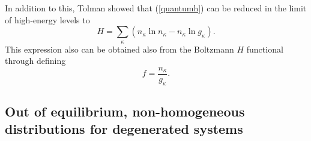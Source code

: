\documentclass{article}
\begin{document}
In addition to this, Tolman showed that (\ref{quantumh}) can be reduced in the limit of high-energy levels to
\begin{equation}
    H = \sum_{\kappa} (n_{\kappa} \ln n_{\kappa} - n_{\kappa} \ln g_{\kappa}). \label{reduce-h}
\end{equation}
This expression also can be obtained also from the Boltzmann $H$ functional through defining 
\begin{equation}
    f=\frac{n_{\kappa}}{ g_{\kappa}}.
\end{equation}
\subsection{Out of equilibrium, non-homogeneous distributions for degenerated systems}
\end{document}
